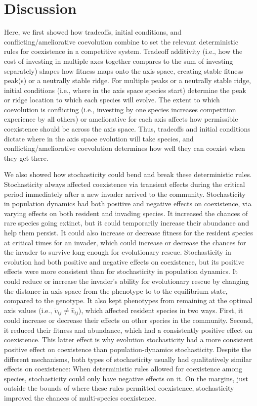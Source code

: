 
\section*{Discussion}

Here, we first showed how tradeoffs, initial conditions, and conflicting/ameliorative coevolution
combine to set the relevant deterministic rules for coexistence in a competitive system.
Tradeoff additivity (i.e., how the cost of investing in multiple axes together 
compares to the sum of investing separately) shapes how fitness maps onto the axis space,
creating stable fitness peak(s) or a neutrally stable ridge.
For multiple peaks or a neutrally stable ridge, initial conditions (i.e., where in the 
axis space species start) determine the peak or ridge location to which each species will evolve.
The extent to which coevolution is conflicting (i.e., investing by one species increases 
competition experience by all others) or ameliorative for each axis affects
how permissible coexistence should be across the axis space.
Thus, tradeoffs and initial conditions dictate where in the axis space evolution will take species, and 
conflicting/ameliorative coevolution determines how well they can 
coexist when they get there.





We also showed how stochasticity could bend and break these deterministic rules.
Stochasticity always affected coexistence via transient effects during the 
critical period immediately after a new invader arrived to the community.
Stochasticity in population dynamics had both positive and negative effects on
coexistence, via varying effects on both resident and invading species.
It increased the chances of rare species going extinct,
but it could temporarily increase their abundance and help them persist.
It could also increase or decrease fitness for
the resident species at critical times for an invader, which
could increase or decrease the chances for the invader to survive long enough 
for evolutionary rescue.
Stochasticity in evolution had both positive and negative effects on
coexistence, but its positive effects were more consistent than for stochasticity in 
population dynamics.
It could reduce or increase the invader's ability for 
evolutionary rescue by changing the distance in axis space from the phenotype to 
to the equilibrium state, compared to the genotype.
It also kept phenotypes from remaining at the optimal 
axis values (i.e., $\ddot{v}_{ij} \ne \hat{v}_{ij}$),
which affected resident species in two ways.
First, it could increase or decrease their effects on other species in the community.
Second, it reduced their fitness and abundance, which had a consistently 
positive effect on coexistence.
This latter effect is why evolution stochasticity had a more consistent positive effect
on coexistence than population-dynamics stochasticity.
Despite the different mechanisms, both types of stochasticity usually had qualitatively
similar effects on coexistence:
When deterministic rules allowed for coexistence among species, 
stochasticity could only have negative effects on it.
On the margins, just outside the bounds of where these rules permitted coexistence, 
stochasticity improved the chances of multi-species coexistence.


